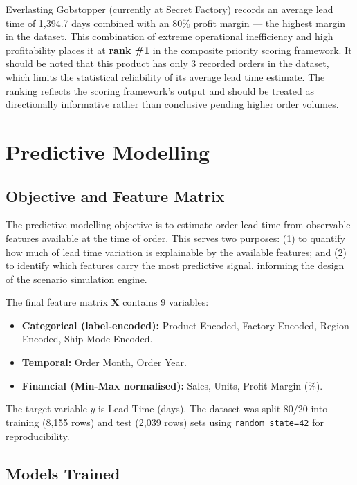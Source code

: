 \documentclass[12pt, a4paper]{article}
\begin{document}
Everlasting Gobstopper (currently at Secret Factory) records an
average lead time of 1,394.7 days combined with an 80\% profit
margin --- the highest margin in the dataset.
This combination of extreme operational inefficiency and high
profitability places it at \textbf{rank \#1} in the composite
priority scoring framework.
It should be noted that this product has only 3 recorded orders
in the dataset, which limits the statistical reliability of its
average lead time estimate. The ranking reflects the scoring
framework's output and should be treated as directionally
informative rather than conclusive pending higher order volumes.

\section{Predictive Modelling}
\label{sec:model}

\subsection{Objective and Feature Matrix}

The predictive modelling objective is to estimate order lead time
from observable features available at the time of order.
This serves two purposes: (1) to quantify how much of lead time
variation is explainable by the available features; and (2) to
identify which features carry the most predictive signal,
informing the design of the scenario simulation engine.

The final feature matrix $\mathbf{X}$ contains 9 variables:

\begin{itemize}[leftmargin=*]
    \item \textbf{Categorical (label-encoded):} Product Encoded,
          Factory Encoded, Region Encoded, Ship Mode Encoded.
    \item \textbf{Temporal:} Order Month, Order Year.
    \item \textbf{Financial (Min-Max normalised):} Sales, Units,
          Profit Margin (\%).
\end{itemize}

The target variable $y$ is Lead Time (days).
The dataset was split 80/20 into training (8,155 rows) and test
(2,039 rows) sets using \texttt{random\_state=42} for
reproducibility.

\subsection{Models Trained}
\end{document}
